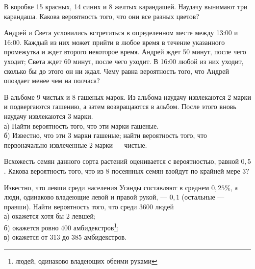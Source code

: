 \newpage\setcounter{zad}{0}



\begin{zkrW}{20}\noindent 
	В коробке 15 красных, 14 синих и 8 желтых карандашей. Наудачу вынимают три карандаша. Какова вероятность того, что они все разных цветов?
 
\end{zkrW}

\begin{zkrW}{20}\noindent 
	Андрей и Света условились встретиться в определенном месте между 13:00 и 16:00. Каждый из них может прийти в любое время в течение указанного промежутка и ждет второго некоторое время. Андрей ждет 50 минут, после чего уходит; Света ждет 60 минут, после чего уходит. В 16:00 любой из них уходит, сколько бы до этого он ни ждал. Чему равна вероятность того, что Андрей опоздает менее чем на полчаса?
 
\end{zkrW}

\begin{zkrW}{20}\noindent 
	В альбоме 9 чистых и 8 гашеных марок. Из альбома наудачу извлекаются 2 марки и подвергаются гашению, а затем возвращаются в альбом. После этого вновь наудачу извлекаются 3 марки. \\ \indent а) Найти вероятность того, что эти марки гашеные. \\ \indent б) Известно, что эти 3 марки гашеные; найти вероятность того, что первоначально извлеченные 2 марки --- чистые.
 
\end{zkrW}

\begin{zkrW}{20}\noindent 
	Всхожесть семян данного сорта растений оценивается с вероятностью, равной $0{,}5$. Какова вероятность того, что из 8 посеянных семян взойдут по крайней мере 3?
 
\end{zkrW}

\begin{zkrW}{20}\noindent 
	Известно, что левши среди населения Уганды составляют в среднем $0{,}25\%$, а люди, одинаково владеющие левой и правой рукой, --- $0{,}1$ (остальные --- правши). Найти вероятность того, что среди 3600 людей \\ \indent а) окажется хотя бы 2 левшей; \\ \indent б) окажется ровно 400 амбидекстров\footnote{людей, одинаково владеющих обеими руками}; \\ \indent в) окажется от 313 до 385 амбидекстров.
 
\end{zkrW}

